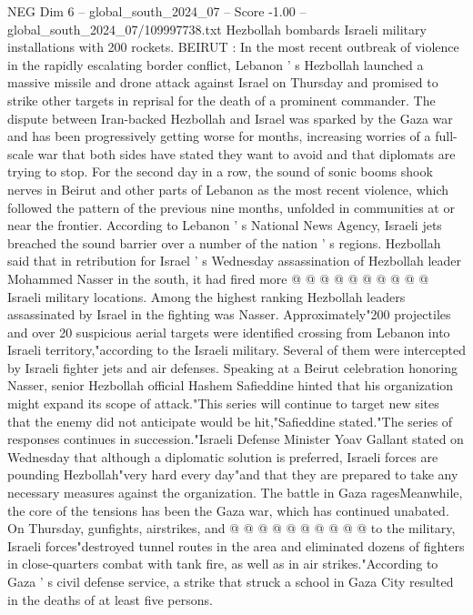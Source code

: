 \begin{textsample}{NEG Dim 6 – global\_south\_2024\_07 – Score -1.00 – global\_south\_2024\_07/109997738.txt}  \label{ex:f6_neg_130}
Hezbollah bombards Israeli military installations with 200 rockets.
BEIRUT : In the most recent outbreak of violence in the rapidly escalating border conflict, Lebanon ' s Hezbollah launched a massive missile and drone attack against Israel on Thursday and promised to strike other targets in reprisal for the death of a prominent commander.
The dispute between Iran-backed Hezbollah and Israel was sparked by the Gaza war and has been progressively getting worse for months, increasing worries of a full-scale war that both sides have stated they want to avoid and that diplomats are trying to stop.
For the second day in a row, the sound of sonic booms shook nerves in Beirut and other parts of Lebanon as the most recent violence, which followed the pattern of the previous nine months, unfolded in communities at or near the frontier.
According to Lebanon ' s National News Agency, Israeli jets breached the sound barrier over a number of the nation ' s regions.
Hezbollah said that in retribution for Israel ' s Wednesday assassination of Hezbollah leader Mohammed Nasser in the south, it had fired more @ @ @ @ @ @ @ @ @ @ Israeli military locations.
Among the highest ranking Hezbollah leaders assassinated by Israel in the fighting was Nasser.
Approximately"200 projectiles and over 20 suspicious aerial targets were identified crossing from Lebanon into Israeli territory,"according to the Israeli military.
Several of them were intercepted by Israeli fighter jets and air defenses.
Speaking at a Beirut celebration honoring Nasser, senior Hezbollah official Hashem Safieddine hinted that his organization might expand its scope of attack."This series will continue to target new sites that the enemy did not anticipate would be hit,"Safieddine stated."The series of responses continues in succession."Israeli Defense Minister Yoav Gallant stated on Wednesday that although a diplomatic solution is preferred, Israeli forces are pounding Hezbollah"very hard every day"and that they are prepared to take any necessary measures against the organization.
The battle in Gaza ragesMeanwhile, the core of the tensions has been the Gaza war, which has continued unabated.
On Thursday, gunfights, airstrikes, and @ @ @ @ @ @ @ @ @ @ to the military, Israeli forces"destroyed tunnel routes in the area and eliminated dozens of fighters in close-quarters combat with tank fire, as well as in air strikes."According to Gaza ' s civil defense service, a strike that struck a school in Gaza City resulted in the deaths of at least five persons.

\end{textsample}
